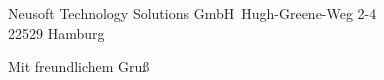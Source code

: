\documentclass[ebner,paper=a4,fontsize=11pt,ngerman,BCOR=10mm]{scrlttr2}%
\begin{document}
\begin{letter}{Neusoft Technology Solutions GmbH\
Hugh-Greene-Weg 2-4\\
22529 Hamburg}
% 
% 
% 
% 
% 
% 
% 

\closing{Mit freundlichem Gru\ss}
\enlargethispage{6\baselineskip}

\end{letter}
\end{document}
